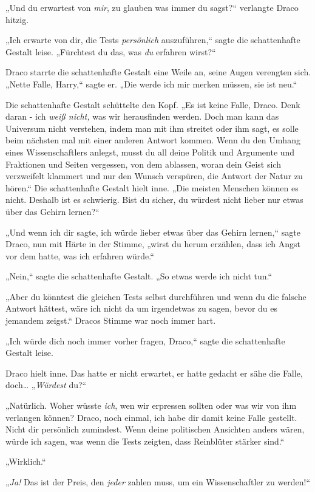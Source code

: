 {„Und du erwartest von \emph{mir}, zu glauben was immer du sagst?“ verlangte Draco hitzig.

„Ich erwarte von dir, die Tests \emph{persönlich} auszuführen,“ sagte die schattenhafte Gestalt leise. „Fürchtest du das, was \emph{du} erfahren wirst?“

Draco starrte die schattenhafte Gestalt eine Weile an, seine Augen verengten sich. „Nette Falle, Harry,“ sagte er. „Die werde ich mir merken müssen, sie ist neu.“

Die schattenhafte Gestalt schüttelte den Kopf. „Es ist keine Falle, Draco. Denk daran - ich \emph{weiß nicht,} was wir herausfinden werden. Doch man kann das Universum nicht verstehen, indem man mit ihm streitet oder ihm sagt, es solle beim nächsten mal mit einer anderen Antwort kommen. Wenn du den Umhang eines Wissenschaftlers anlegst, musst du all deine Politik und Argumente und Fraktionen und Seiten vergessen, von dem ablassen, woran dein Geist sich verzweifelt klammert und nur den Wunsch verspüren, die Antwort der Natur zu hören.“ Die schattenhafte Gestalt hielt inne. „Die meisten Menschen können es nicht. Deshalb ist es schwierig. Bist du sicher, du würdest nicht lieber nur etwas über das Gehirn lernen?“

„Und wenn ich dir sagte, ich würde lieber etwas über das Gehirn lernen,“ sagte Draco, nun mit Härte in der Stimme, „wirst du herum erzählen, dass ich Angst vor dem hatte, was ich erfahren würde.“

„Nein,“ sagte die schattenhafte Gestalt. „So etwas werde ich nicht tun.“

„Aber du könntest die gleichen Tests selbst durchführen und wenn du die falsche Antwort hättest, wäre ich nicht da um irgendetwas zu sagen, bevor du es jemandem zeigst.“ Dracos Stimme war noch immer hart.

„Ich würde dich noch immer vorher fragen, Draco,“ sagte die schattenhafte Gestalt leise.

Draco hielt inne. Das hatte er nicht erwartet, er hatte gedacht er sähe die Falle, doch… „\emph{Würdest} du?“

„Natürlich. Woher wüsste \emph{ich}, wen wir erpressen sollten oder was wir von ihm verlangen können? Draco, noch einmal, ich habe dir damit keine Falle gestellt. Nicht dir persönlich zumindest. Wenn deine politischen Ansichten anders wären, würde ich sagen, was wenn die Tests zeigten, dass Reinblüter stärker sind.“

„Wirklich.“

„\emph{Ja!} Das ist der Preis, den \emph{jeder} zahlen muss, um ein Wissenschaftler zu werden!“

}
